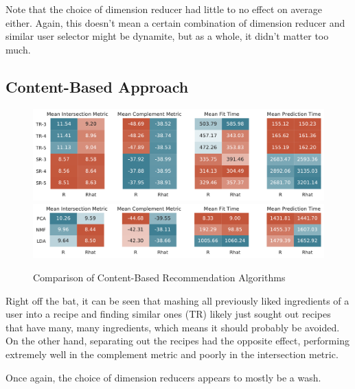 \documentclass[11pt]{article}
\begin{document}
Note that the choice of dimension reducer had little to no effect on average either. Again, this doesn't mean a certain combination of dimension reducer and similar user selector might be dynamite, but as a whole, it didn't matter too much.

\subsection{Content-Based Approach}

\begin{figure}[b!]
\centering
\includegraphics[width=1\textwidth]{figs/recipe_rdr.pdf}
\includegraphics[width=1\textwidth]{figs/recipe_dr.pdf}
\caption{Comparison of Content-Based Recommendation Algorithms}
\label{fig:recipe_results}
\end{figure}

Right off the bat, it can be seen that mashing all previously liked ingredients of a user into a recipe and finding similar ones (TR) likely just sought out recipes that have many, many ingredients, which means it should probably be avoided. On the other hand, separating out the recipes had the opposite effect, performing extremely well in the complement metric and poorly in the intersection metric.

Once again, the choice of dimension reducers appears to mostly be a wash.
\end{document}
